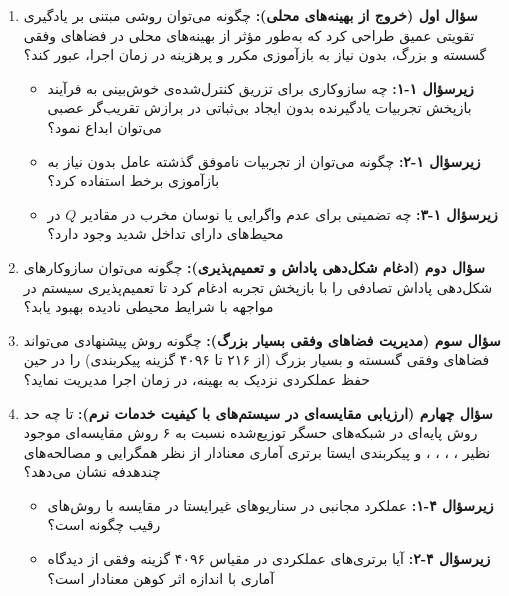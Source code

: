 \documentclass[oneside,openany,phd]{TMU-Thesis}
\begin{document}
\begin{enumerate}
  \item \textbf{سؤال اول (خروج از بهینه‌های محلی):} چگونه می‌توان روشی مبتنی بر یادگیری تقویتی عمیق طراحی کرد که به‌طور مؤثر از بهینه‌های محلی در فضاهای وفقی گسسته و بزرگ، بدون نیاز به بازآموزی مکرر و پرهزینه در زمان اجرا، عبور کند؟
  \begin{itemize}
      \item \textbf{زیرسؤال ۱-۱:} چه سازوکاری برای تزریق کنترل‌شده‌ی خوش‌بینی به فرآیند بازپخش تجربیات یادگیرنده بدون ایجاد بی‌ثباتی در برازش تقریب‌گر عصبی می‌توان ابداع نمود؟
      \item \textbf{زیرسؤال ۱-۲:} چگونه می‌توان از تجربیات ناموفق گذشته عامل بدون نیاز به بازآموزی برخط استفاده کرد؟
      \item \textbf{زیرسؤال ۱-۳:} چه تضمینی برای عدم واگرایی یا نوسان مخرب در مقادیر $Q$ در محیط‌های دارای تداخل شدید وجود دارد؟
  \end{itemize}
  
  \item \textbf{سؤال دوم (ادغام شکل‌دهی پاداش و تعمیم‌پذیری):} چگونه می‌توان سازوکارهای شکل‌دهی پاداش تصادفی را با بازپخش تجربه ادغام کرد تا تعمیم‌پذیری سیستم در مواجهه با شرایط محیطی نادیده بهبود یابد؟
  
  \item \textbf{سؤال سوم (مدیریت فضاهای وفقی بسیار بزرگ):} چگونه روش پیشنهادی می‌تواند فضاهای وفقی گسسته و بسیار بزرگ (از ۲۱۶ تا ۴۰۹۶ گزینه پیکربندی) را در حین حفظ عملکردی نزدیک به بهینه، در زمان اجرا مدیریت نماید؟
  
  \item \textbf{سؤال چهارم (ارزیابی مقایسه‌ای در سیستم‌های با کیفیت خدمات نرم):} تا چه حد روش پایه‌ای  در شبکه‌های حسگر توزیع‌شده  نسبت به ۶ روش مقایسه‌ای موجود نظیر  \cite{mnih2015human}،  \cite{andrychowicz2017her}،  \cite{he2020softher}،  \cite{weyns2022deep}،  \cite{quin2019efficient, quin2022reducing} و پیکربندی ایستا برتری آماری معنادار از نظر همگرایی و مصالحه‌های چندهدفه نشان می‌دهد؟
  \begin{itemize}
      \item \textbf{زیرسؤال ۴-۱:} عملکرد مجانبی  در سناریوهای غیرایستا در مقایسه با روش‌های رقیب چگونه است؟
      \item \textbf{زیرسؤال ۴-۲:} آیا برتری‌های عملکردی در مقیاس ۴۰۹۶ گزینه وفقی از دیدگاه آماری با اندازه اثر کوهن معنادار است؟
  \end{itemize}


\end{enumerate}
\end{document}

